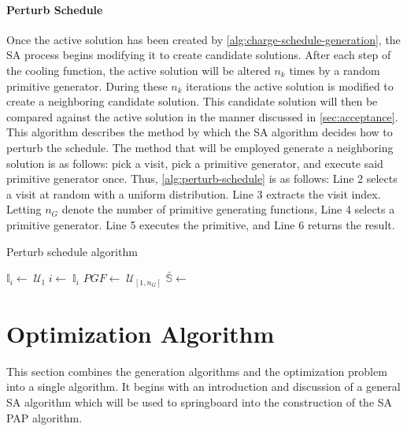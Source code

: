 \documentclass[11pt,a4paper,final]{article}
\newcommand{\I}{\mathbb{I}}                 %
\newcommand{\C}{\mathbb{C}}                 %
\newcommand{\U}{\mathcal{U}}                %
\newcommand{\Sol}{\mathbb{S}}               %
\begin{document}
\paragraph{Perturb Schedule}
\label{sec:tweak-schedule}
Once the active solution has been created by \ref{alg:charge-schedule-generation}, the SA process begins modifying it to
create candidate solutions. After each step of the cooling function, the active solution will be altered \(n_k\) times by
a random primitive generator. During these \(n_k\) iterations the active solution is modified to create a neighboring
candidate solution. This candidate solution will then be compared against the active solution in the manner discussed in
\ref{sec:acceptance}. This algorithm describes the method by which the SA algorithm decides how to perturb the schedule. The
method that will be employed generate a neighboring solution is as follows: pick a visit, pick a primitive generator,
and execute said primitive generator once. Thus, \ref{alg:perturb-schedule} is as follows: Line 2 selects a visit at
random with a uniform distribution. Line 3 extracts the visit index. Letting \(n_G\) denote the number of primitive
generating functions, Line 4 selects a primitive generator. Line 5 executes the primitive, and Line 6 returns the
result.

\begin{algorithm}[H]
\caption{Perturb schedule algorithm} \label{alg:perturb-schedule}

    \LinesNumbered
    \KwIn{$\I$, $\C$}
    \KwOut{$\bar{\I}$, $\bar{\C}$}


    \Begin
    {
        $\I_i\leftarrow\; \U_{\I}$
        $i \leftarrow\; \I_i$
        $PGF \leftarrow\; \U_{[1,n_G]}$
        $\bar{\Sol} \leftarrow$ \PGF{($i$, $\I$, $\C$)}
        \Return{($\_, \bar{\I}$, $\bar{\C}$)}
    }
\end{algorithm}
\section{Optimization Algorithm}
\label{sec:optimization-algorithm}
This section combines the generation algorithms and the optimization problem into a single algorithm. It begins with an
introduction and discussion of a general SA algorithm which will be used to springboard into the construction of the SA
PAP algorithm.
\end{document}
